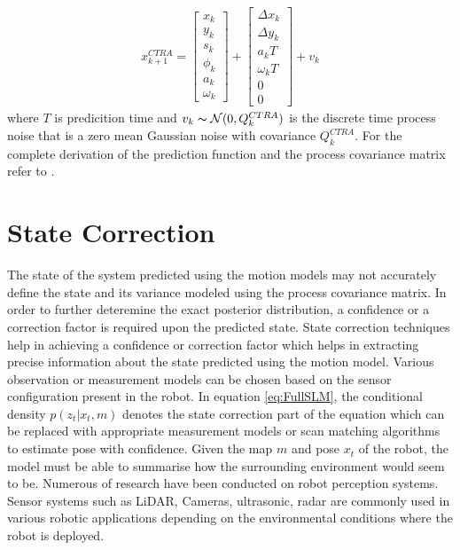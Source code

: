 \begin{gather} \label{CTRA_pred_ct}
    x_{k+1}^{CTRA}
    =
    \begin{bmatrix} 
        x_k \\ y_k \\ s_k \\ \phi_k \\ a_k\\ \omega_k
    \end{bmatrix}
    +
    \begin{bmatrix} 
        \Delta x_k \\ \Delta y_k \\ a_k T \\ \omega_k T \\ 0 \\ 0
    \end{bmatrix}
    + v_k
\end{gather}
where $T$ is predicition time and $v_k \thicksim  \mathcal{N}(0,Q_{k}^{CTRA})$ is the discrete time process noise that is a zero mean Gaussian noise with covariance $Q_k^{CTRA}$. For the complete derivation of the prediction function and the 
process covariance matrix refer to \cite{D.Svensson}.

\section{State Correction}
The state of the system predicted using the motion models may not accurately define the state and its variance modeled using the process covariance matrix. In order to further deteremine 
the exact posterior distribution, a confidence or a correction factor is required upon the predicted state. State correction techniques help in achieving a confidence or correction factor which helps in extracting precise information about the state predicted using the motion model. Various observation or measurement models can be chosen based on the sensor configuration present in the robot. In equation \ref{eq:FullSLM}, the conditional density $p(z_t | x_t, m)$ denotes the state correction part of the equation which can be replaced with appropriate measurement models or scan matching algorithms to estimate pose with confidence. Given the map $m$ and pose $x_t$ of the robot, the model must be able to summarise how the surrounding environment would seem to be. Numerous of research have been conducted on robot perception systems. Sensor systems such as LiDAR, Cameras, ultrasonic, radar are commonly used in various robotic applications depending on the environmental conditions where the robot is deployed.

